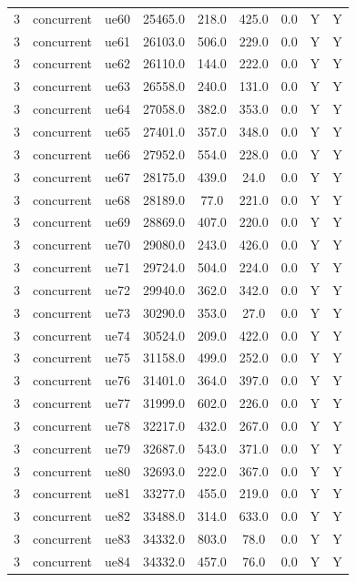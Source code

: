 \begin{table}[ht]
\begin{tabular}{|c|c|c|c|c|c|c|c|c|}
3 & concurrent & ue60 & 25465.0 & 218.0 & 425.0 & 0.0 & Y & Y \\
3 & concurrent & ue61 & 26103.0 & 506.0 & 229.0 & 0.0 & Y & Y \\
3 & concurrent & ue62 & 26110.0 & 144.0 & 222.0 & 0.0 & Y & Y \\
3 & concurrent & ue63 & 26558.0 & 240.0 & 131.0 & 0.0 & Y & Y \\
3 & concurrent & ue64 & 27058.0 & 382.0 & 353.0 & 0.0 & Y & Y \\
3 & concurrent & ue65 & 27401.0 & 357.0 & 348.0 & 0.0 & Y & Y \\
3 & concurrent & ue66 & 27952.0 & 554.0 & 228.0 & 0.0 & Y & Y \\
3 & concurrent & ue67 & 28175.0 & 439.0 & 24.0 & 0.0 & Y & Y \\
3 & concurrent & ue68 & 28189.0 & 77.0 & 221.0 & 0.0 & Y & Y \\
3 & concurrent & ue69 & 28869.0 & 407.0 & 220.0 & 0.0 & Y & Y \\
3 & concurrent & ue70 & 29080.0 & 243.0 & 426.0 & 0.0 & Y & Y \\
3 & concurrent & ue71 & 29724.0 & 504.0 & 224.0 & 0.0 & Y & Y \\
3 & concurrent & ue72 & 29940.0 & 362.0 & 342.0 & 0.0 & Y & Y \\
3 & concurrent & ue73 & 30290.0 & 353.0 & 27.0 & 0.0 & Y & Y \\
3 & concurrent & ue74 & 30524.0 & 209.0 & 422.0 & 0.0 & Y & Y \\
3 & concurrent & ue75 & 31158.0 & 499.0 & 252.0 & 0.0 & Y & Y \\
3 & concurrent & ue76 & 31401.0 & 364.0 & 397.0 & 0.0 & Y & Y \\
3 & concurrent & ue77 & 31999.0 & 602.0 & 226.0 & 0.0 & Y & Y \\
3 & concurrent & ue78 & 32217.0 & 432.0 & 267.0 & 0.0 & Y & Y \\
3 & concurrent & ue79 & 32687.0 & 543.0 & 371.0 & 0.0 & Y & Y \\
3 & concurrent & ue80 & 32693.0 & 222.0 & 367.0 & 0.0 & Y & Y \\
3 & concurrent & ue81 & 33277.0 & 455.0 & 219.0 & 0.0 & Y & Y \\
3 & concurrent & ue82 & 33488.0 & 314.0 & 633.0 & 0.0 & Y & Y \\
3 & concurrent & ue83 & 34332.0 & 803.0 & 78.0 & 0.0 & Y & Y \\
3 & concurrent & ue84 & 34332.0 & 457.0 & 76.0 & 0.0 & Y & Y \\

\end{tabular}
\end{table}
